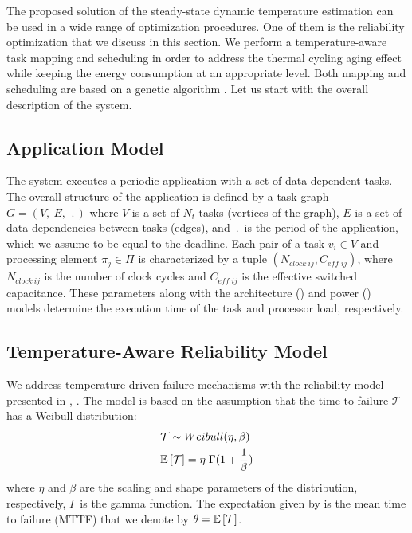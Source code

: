 The proposed solution of the steady-state dynamic temperature estimation can be used in a wide range of optimization procedures. One of them is the reliability optimization that we discuss in this section. We perform a temperature-aware task mapping and scheduling in order to address the thermal cycling aging effect while keeping the energy consumption at an appropriate level. Both mapping and scheduling are based on a genetic algorithm \cite{schmitz2004}. Let us start with the overall description of the system.

\subsection{Application Model} \label{sec:application-model}
The system executes a periodic application with a set of data dependent tasks. The overall structure of the application is defined by a task graph $G = (V, \: E, \: \period)$ where $V$ is a set of $N_t$ tasks (vertices of the graph), $E$ is a set of data dependencies between tasks (edges), and $\period$ is the period of the application, which we assume to be equal to the deadline. Each pair of a task $v_i \in V$ and processing element $\pi_j \in \Pi$ is characterized by a tuple $(N_{clock \: ij}, C_{eff \; ij})$, where $N_{clock \: ij}$ is the number of clock cycles and $C_{eff \; ij}$ is the effective switched capacitance. These parameters along with the architecture () and power () models determine the execution time of the task and processor load, respectively.

\subsection{Temperature-Aware Reliability Model} \label{sec:reliability-model}
We address temperature-driven failure mechanisms with the reliability model presented in \cite{huang2009}, \cite{xiang2010}. The model is based on the assumption that the time to failure $\mathcal{T}$ has a Weibull distribution:
\begin{align}
  & \mathcal{T} \sim Weibull(\eta, \beta) \nonumber \\
  & \mathbb{E}\left[ \mathcal{T} \right] = \eta \; \Gamma(1 + \frac{1}{\beta}) \label{eq:general-mttf}
\end{align}
where $\eta$ and $\beta$ are the scaling and shape parameters of the distribution, respectively, $\Gamma$ is the gamma function. The expectation given by  is the mean time to failure (MTTF) that we denote by $\theta = \mathbb{E}\left[ \mathcal{T} \right]$.

